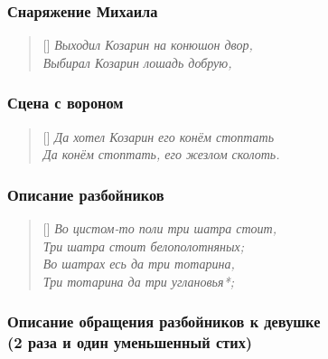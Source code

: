 \documentclass[12pt]{article}
\begin{document}
\subsubsection{Снаряжение Михаила}


\settowidth{\versewidth}{Богатырскому серцу розгоретися,}
\begin{verse}[\versewidth]
\itshape
Выходил Козарин на конюшон двор, \\
Выбирал Козарин лошадь добрую,
\end{verse}

\subsubsection{Сцена с вороном}

\settowidth{\versewidth}{Богатырскому серцу розгоретися,}
\begin{verse}[\versewidth]
\itshape
Да хотел Козарин его конём стоптать \\
Да конём стоптать, его жезлом сколоть.
\end{verse}


\subsubsection{Описание разбойников}

\settowidth{\versewidth}{Богатырскому серцу розгоретися,}
\begin{verse}[\versewidth]
\itshape
Во цистом-то поли три шатра стоит, \\
Три шатра стоит белополотняных; \\
Во шатрах есь да три тотарина, \\
Три тотарина да три углановья*;
\end{verse}



\subsubsection{Описание обращения разбойников к девушке \\(2 раза и один уменьшенный стих)}
\end{document}
